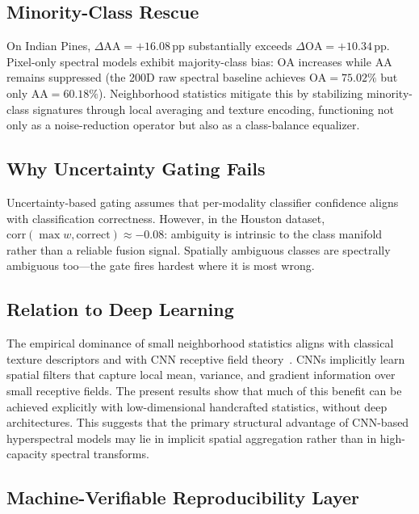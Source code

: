 \documentclass[journal]{IEEEtran}
\newcommand{\pp}{\,\text{pp}}
\newcommand{\OA}{\ensuremath{\mathrm{OA}}}
\newcommand{\Acc}{\ensuremath{\mathrm{AA}}}  %
\begin{document}
\subsection{Minority-Class Rescue}

On Indian Pines, $\Delta\Acc{=}+16.08\pp$ substantially exceeds
$\Delta\OA{=}+10.34\pp$. Pixel-only spectral models exhibit
majority-class bias: $\OA$ increases while $\Acc$ remains suppressed
(the 200D raw spectral baseline achieves $\OA{=}75.02\%$ but only
$\Acc{=}60.18\%$). Neighborhood statistics mitigate this by
stabilizing minority-class signatures through local averaging and
texture encoding, functioning not only as a noise-reduction operator
but also as a class-balance equalizer.

\subsection{Why Uncertainty Gating Fails}

Uncertainty-based gating assumes that per-modality classifier
confidence aligns with classification correctness. However, in the
Houston dataset, $\mathrm{corr}(\max w, \mathrm{correct}) \approx
-0.08$: ambiguity is intrinsic to the class manifold rather than a
reliable fusion signal. Spatially ambiguous classes are spectrally
ambiguous too---the gate fires hardest where it is most wrong.

\subsection{Relation to Deep Learning}

The empirical dominance of small neighborhood statistics aligns with
classical texture descriptors and with CNN receptive field
theory~\cite{hu2015_deep_cnn_hsi}. CNNs implicitly learn spatial filters
that capture local mean, variance, and gradient information over
small receptive fields. The present results show that much of this
benefit can be achieved explicitly with low-dimensional
handcrafted statistics, without deep architectures. This suggests
that the primary structural advantage of CNN-based hyperspectral
models may lie in implicit spatial aggregation rather than in
high-capacity spectral transforms.

\subsection{Machine-Verifiable Reproducibility Layer}
\end{document}
